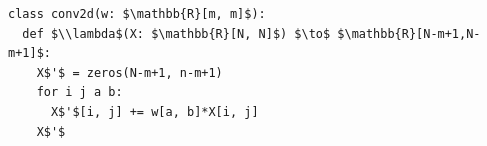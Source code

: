 \documentclass[border=10pt]{standalone}
\begin{document}
\begin{lstlisting}
class conv2d(w: $\mathbb{R}[m, m]$):
  def $\\lambda$(X: $\mathbb{R}[N, N]$) $\to$ $\mathbb{R}[N-m+1,N-m+1]$:
    X$'$ = zeros(N-m+1, n-m+1)
    for i j a b:
      X$'$[i, j] += w[a, b]*X[i, j]
    X$'$
\end{lstlisting}
\end{document}
